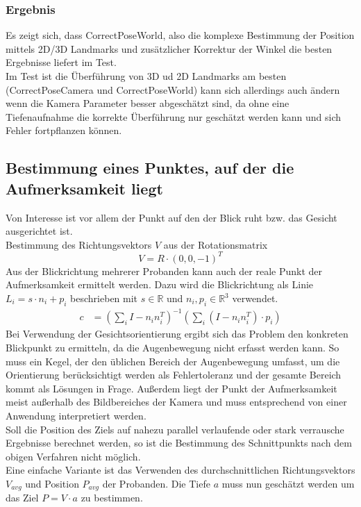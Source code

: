 \subsubsection{Ergebnis}
Es zeigt sich, dass CorrectPoseWorld, also die komplexe Bestimmung der Position mittels 2D/3D Landmarks und zusätzlicher Korrektur der Winkel die besten Ergebnisse liefert im Test.\\
Im Test ist die Überführung von 3D ud 2D Landmarks am besten (CorrectPoseCamera und CorrectPoseWorld) kann sich allerdings auch ändern wenn die Kamera Parameter besser abgeschätzt sind, da ohne eine Tiefenaufnahme die korrekte Überführung nur geschätzt werden kann und sich Fehler fortpflanzen können.
\subsection{Bestimmung eines Punktes, auf der die Aufmerksamkeit liegt}
Von Interesse ist vor allem der Punkt auf den der Blick ruht bzw. das Gesicht ausgerichtet ist.\\
Bestimmung des Richtungsvektors $V$ aus der Rotationsmatrix
\[V= R\cdot (0,0,-1)^T\] 
Aus der Blickrichtung mehrerer Probanden kann auch der reale Punkt der Aufmerksamkeit ermittelt werden. Dazu wird die Blickrichtung als Linie $L_i = s \cdot n_i+ p_i$ beschrieben mit $s\in \mathbb{R}$ und $n_i,p_i \in \mathbb{R}^3$ verwendet.
\begin{align*}
c&=(\sum_{i} I -n_in_i^T)^{-1}
(\sum_{i} (I -n_in_i^T)\cdot p_i)
\end{align*}
Bei Verwendung der Gesichtsorientierung ergibt sich das Problem den konkreten Blickpunkt zu ermitteln, da die Augenbewegung nicht erfasst werden kann.
So muss ein Kegel, der den üblichen Bereich der Augenbewegung umfasst, um die Orientierung berücksichtigt werden als Fehlertoleranz und der gesamte Bereich kommt als Lösungen in Frage.
Außerdem liegt der Punkt der Aufmerksamkeit meist außerhalb des Bildbereiches der Kamera und muss entsprechend von einer Anwendung interpretiert werden.\\
Soll die Position des Ziels auf nahezu parallel verlaufende oder stark verrausche Ergebnisse berechnet werden, so ist die Bestimmung des Schnittpunkts nach dem obigen Verfahren nicht möglich.\\
Eine einfache Variante ist das Verwenden des durchschnittlichen Richtungsvektors $V_{avg}$ und Position $P_{avg}$ der Probanden. Die Tiefe $a$ muss nun geschätzt werden um das Ziel $P=V\cdot a$ zu bestimmen.